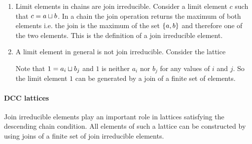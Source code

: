 \begin{enumerate}
    \item Limit elements in chains are join irreducible. Consider a limit
        element $c$ such that $c = a \sqcup b$. In a chain the join operation
        returns the maximum of both elements i.e. the join is the maximum of the
        set $\left\{a,b\right\}$ and therefore one of the two elements. This is the
        definition of a join irreducible element.

    \item A limit element in general is not join irreducible. Consider the
        lattice


        Note that $1 = a_i \sqcup b_j$ and $1$ is neither $a_i$ nor $b_j$ for any
        values of $i$ and $j$. So the limit element $1$ can be generated by a
        join of a finite set of elements.
\end{enumerate}





\paragraph{DCC lattices}
Join irreducible elements play an important role in lattices satisfying the
descending chain condition. All elements of such a lattice can be constructed by
using joins of a finite set of join irreducible elements.


